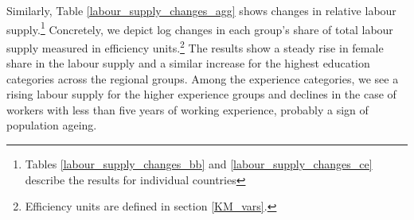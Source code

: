 \documentclass[11pt]{article}
\begin{document}
Similarly, Table \ref{labour_supply_changes_agg} shows changes in relative labour supply.\footnote{Tables \ref{labour_supply_changes_bb} and \ref{labour_supply_changes_ce} describe the results for individual countries} Concretely, we depict log changes in each group's share of total labour supply measured in efficiency units.\footnote{Efficiency units are defined in section \ref{KM_vars}.} The results show a steady rise in female share in the labour supply and a similar increase for the highest education categories across the regional groups. Among the experience categories, we see a rising labour supply for the higher experience groups and declines in the case of workers with less than five years of working experience, probably a sign of population ageing.


\begin{table}[!htbp]
\centering 
\caption{Changes of Labour Supply for Different Groups of Countries.}
\label{labour_supply_changes_agg}
\begin{center}
\resizebox{\textwidth}{!}{


}
\end{center}
\end{table}
\end{document}
